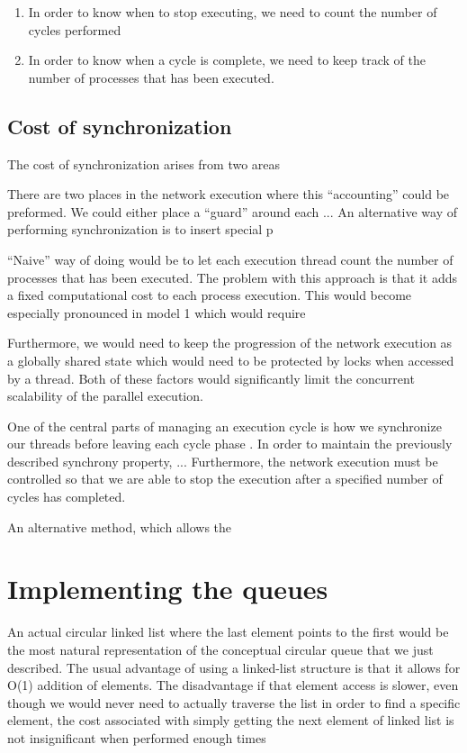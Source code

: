 \begin{enumerate}
\item In order to know when to stop executing, we need to count the
  number of cycles performed
\item In order to know when a cycle is complete, we need to keep track
  of the number of processes that has been executed.
\end{enumerate}

\subsection{Cost of synchronization}
The cost of synchronization arises from two areas


There are two places in the network execution where this
``accounting'' could be preformed. We could either place a ``guard''
around each ... An alternative way of performing synchronization is to
insert special p

``Naive'' way of doing would be to let each execution thread count the
number of processes that has been executed. The problem with this
approach is that it adds a fixed computational cost to each process
execution. This would become especially pronounced in model 1
which would require 

Furthermore, we would need to keep the progression of the network
execution as a globally shared state which would need to be protected
by locks when accessed by a thread. Both of these factors would
significantly limit the concurrent scalability of the parallel
execution.

One of the central parts of managing an execution cycle is how we
synchronize our threads before leaving each cycle phase
. In order to maintain the previously described
synchrony property, ... Furthermore, the network execution must be
controlled so that we are able to stop the execution after a specified
number of cycles has completed.


An alternative method, which allows the 

\section{Implementing the queues}
An actual circular linked list where the last element points to the
first would be the most natural representation of the conceptual
circular queue that we just described. The usual advantage of using a
linked-list structure is that it allows for O(1) addition of
elements. The disadvantage if that element access is slower, even
though we would never need to actually traverse the list in order to
find a specific element, the cost associated with simply getting the
next element of linked list is not insignificant when performed enough
times 

